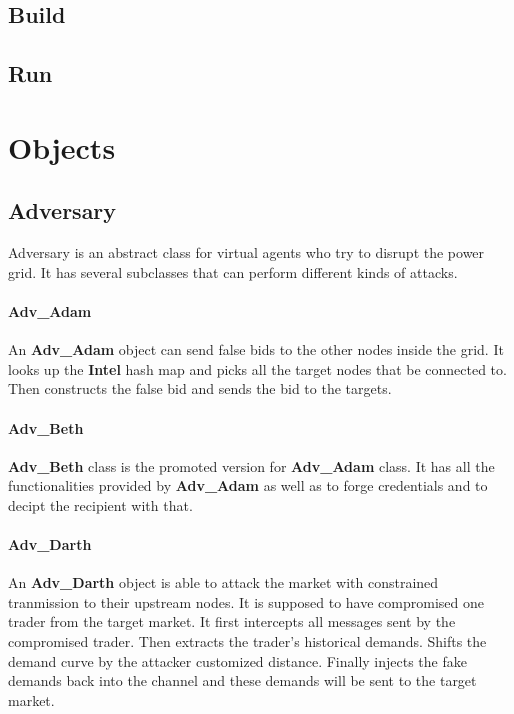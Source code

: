 \documentclass[12pt]{article}
\begin{document}
\subsection {Build}

\subsection {Run}

\section{Objects}

\subsection{Adversary} \mbox{}

Adversary is an abstract class for virtual agents who try to disrupt the
power grid. It has several subclasses that can perform different
kinds of attacks.

\paragraph{Adv\_Adam} \mbox{}

An \textbf{Adv\_Adam} object can send false bids to the other nodes inside the grid. 
It looks up the \textbf{Intel} hash map and picks all the target nodes that be 
connected to. Then constructs the false bid and sends the bid to the targets.

\paragraph{Adv\_Beth} \mbox{}

\textbf{Adv\_Beth} class is the promoted version for \textbf{Adv\_Adam} class. It has all 
the functionalities provided by \textbf{Adv\_Adam} as well as to forge credentials 
and to decipt the recipient with that.

\paragraph{Adv\_Darth} \mbox{}

An \textbf{Adv\_Darth} object is able to attack the market with constrained tranmission 
to their upstream nodes. It is supposed to have compromised one trader from the 
target market. It first intercepts all messages sent by the compromised trader. 
Then extracts the trader's historical demands. Shifts the demand curve by the attacker 
customized distance. Finally injects the fake demands back into the channel and these 
demands will be sent to the target market. 
\end{document}
